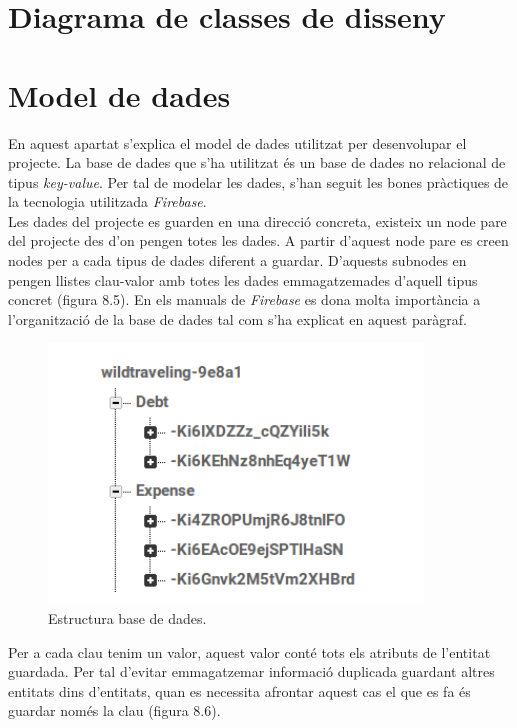 \section{Diagrama de classes de disseny}

\section{Model de dades}

En aquest apartat s'explica el model de dades utilitzat per desenvolupar el projecte. La base de dades que s'ha utilitzat és un base de dades no relacional de tipus \textit{key-value}. Per tal de modelar les dades, s'han seguit les bones pràctiques de la tecnologia utilitzada \textit{Firebase}.\\

Les dades del projecte es guarden en una direcció concreta, existeix un node pare del projecte des d'on pengen totes les dades. A partir d'aquest node pare es creen nodes per a cada tipus de dades diferent a guardar. D'aquests subnodes en pengen llistes clau-valor amb totes les dades emmagatzemades d'aquell tipus concret (figura 8.5). En els manuals de \textit{Firebase} es dona molta importància a l'organització de la base de dades tal com s'ha explicat en aquest paràgraf.\\

\begin{figure}[!h]
\centering
\includegraphics[scale=1.00]{Figures/EstructuraBD.jpg}
\caption{Estructura base de dades.}
\end{figure}


Per a cada clau tenim un valor, aquest valor conté tots els atributs de l'entitat guardada. Per tal d'evitar emmagatzemar informació duplicada guardant altres entitats dins d'entitats, quan es necessita afrontar aquest cas el que es fa és guardar només la clau (figura 8.6).


